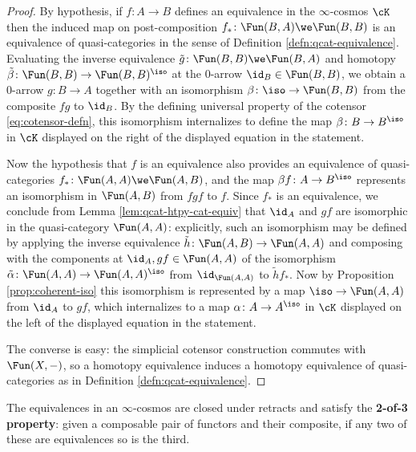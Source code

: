 \begin{proof}
By hypothesis, if $f \colon A \to B$ defines an equivalence in the $\infty$-cosmos $\cK$ then the induced map on post-composition $f_* \colon \Fun(B,A) \we \Fun(B,B)$ is an equivalence of quasi-categories in the sense of Definition \ref{defn:qcat-equivalence}. Evaluating the inverse equivalence $\tilde{g} \colon \Fun(B,B) \we \Fun(B,A)$ and homotopy $\tilde{\beta} \colon \Fun(B,B) \to \Fun(B,B)^\iso$ at the 0-arrow $\id_B \in \Fun(B,B)$, we obtain a 0-arrow $g \colon B \to A$ together with an isomorphism $\beta \colon \iso\to\Fun(B,B)$ from the composite $fg$ to $\id_B$. By the defining universal property of the cotensor \eqref{eq:cotensor-defn}, this isomorphism internalizes to define the map $\beta \colon B \to B^\iso$ in $\cK$ displayed on the right of the displayed equation in the statement.

Now the hypothesis that $f$ is an equivalence also provides an equivalence of quasi-categories $f_* \colon \Fun(A,A) \we \Fun(A,B)$, and the map $\beta f \colon A \to B^\iso$ represents an isomorphism in $\Fun(A,B)$ from $fgf$ to $f$. Since $f_*$ is an equivalence, we conclude from Lemma \ref{lem:qcat-htpy-cat-equiv} that $\id_A$ and $gf$ are isomorphic in the quasi-category $\Fun(A,A)$: explicitly, such an isomorphism may be defined by applying the inverse equivalence $\tilde{h} \colon \Fun(A,B) \to \Fun(A,A)$ and composing with the components at $\id_A, gf \in \Fun(A,A)$ of the isomorphism $\tilde{\alpha} \colon \Fun(A,A) \to \Fun(A,A)^\iso$ from $\id_{\Fun(A,A)}$ to $\tilde{h}f_*$. Now by Proposition \ref{prop:coherent-iso} this isomorphism is represented by a map $\iso \to \Fun(A,A)$ from $\id_A$ to $gf$, which internalizes to a map $\alpha \colon A \to A^\iso$ in $\cK$ displayed on the left of the displayed equation in the statement.

The converse is easy: the simplicial cotensor construction commutes with $\Fun(X,-)$, so a homotopy equivalence induces a  homotopy equivalence of quasi-categories as in Definition \ref{defn:qcat-equivalence}.
\end{proof}


  \begin{lemma}\label{lem:equivalence-2-of-3}
     The equivalences in an $\infty$-cosmos are closed under retracts and satisfy the \textbf{2-of-3 property}: given a composable pair of functors and their composite, if any two of these are equivalences so is the third.
\end{lemma}




